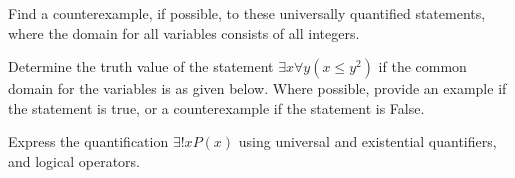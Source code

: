 \documentclass[a4paper]{exam}
\begin{document}
\begin{questions}
  \question Find a counterexample, if possible, to these universally quantified statements, where the domain for all variables consists of all integers.

  \question Determine the truth value of the statement $\exists x \forall y (x \le y^2)$ if the common domain for the variables is as given below. Where possible, provide an example if the statement is true, or a counterexample if the statement is False.
  
  \question Express the quantification $\exists!x P(x)$ using universal and existential quantifiers, and logical operators.
    \begin{solution}
    \end{solution}
  
\end{questions}
\end{document}
